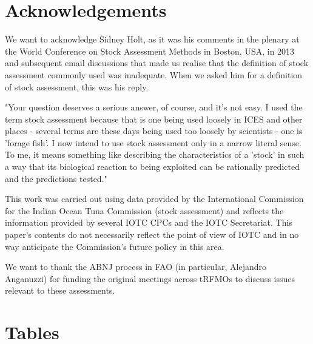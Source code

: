 \documentclass[11pt,a4paper]{article}
\begin{document}
{\section{Acknowledgements}

We want to acknowledge Sidney Holt, as it was his comments in the plenary at the World Conference on Stock Assessment Methods in Boston, USA, in 2013 and subsequent email discussions that made us realise that the definition of stock assessment commonly used was inadequate. When we asked him for a definition of stock assessment, this was his reply.

"Your question deserves a serious answer, of course, and it's not easy. I used the term stock assessment because that is one being used loosely in ICES and other places - several terms are these days being used too loosely by scientists - one is 'forage fish'. I now intend to use stock assessment only in a narrow literal sense. To me, it means something like describing the characteristics of a 'stock' in such a way that its biological reaction to being exploited can be rationally predicted and the predictions tested."

This work was carried out using data provided by the International Commission for the Indian  Ocean  Tuna  Commission  (stock assessment)  and reflects the information provided by several IOTC CPCs and the IOTC Secretariat.  This paper's contents do not necessarily reflect the point of view of IOTC and in no way anticipate the Commission's future policy in this area.

We want to thank the ABNJ process in FAO (in particular, Alejandro Anganuzzi) for funding the original meetings across tRFMOs to discuss issues relevant to these assessments. 

\newpage\clearpage


%


\clearpage
\newpage
\section{Tables}


}
\end{document}
